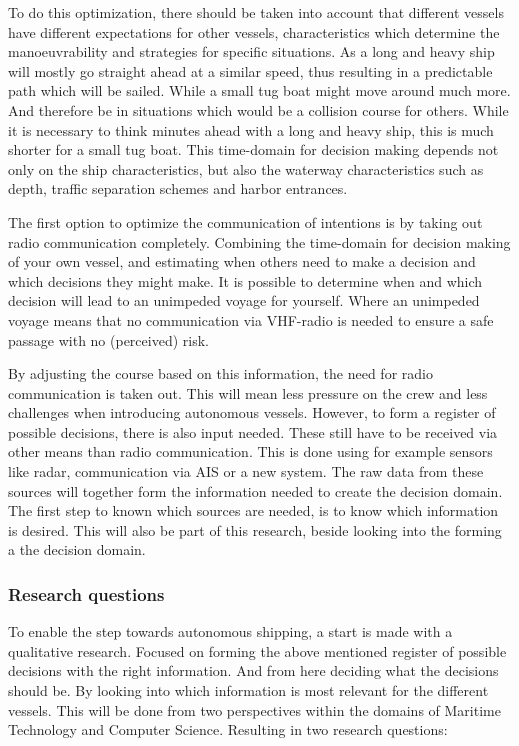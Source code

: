To do this optimization, there should be taken into account that different vessels have different expectations for other vessels, characteristics which determine the manoeuvrability and strategies for specific situations. As a long and heavy ship will mostly go straight ahead at a similar speed, thus resulting in a predictable path which will be sailed. While a small tug boat might move around much more. And therefore be in situations which would be a collision course for others. While it is necessary to think minutes ahead with a long and heavy ship, this is much shorter for a small tug boat. This time-domain for decision making depends not only on the ship characteristics, but also the waterway characteristics such as depth, traffic separation schemes and harbor entrances.

The first option to optimize the communication of intentions is by taking out radio communication completely. Combining the time-domain for decision making of your own vessel, and estimating when others need to make a decision and which decisions they might make. It is possible to determine when and which decision will lead to an unimpeded voyage for yourself. Where an unimpeded voyage means that no communication via VHF-radio is needed to ensure a safe passage with no (perceived) risk.

By adjusting the course based on this information, the need for radio communication is taken out. This will mean less pressure on the crew and less challenges when introducing autonomous vessels.
However, to form a register of possible decisions, there is also input needed. These still have to be received via other means than radio communication. This is done using for example sensors like radar, communication via AIS or a new system. The raw data from these sources will together form the information needed to create the decision domain. The first step to known which sources are needed, is to know which information is desired. This will also be part of this research, beside looking into the forming a the decision domain.

\subsubsection*{Research questions}
To enable the step towards autonomous shipping, a start is made with a qualitative research. Focused on forming the above mentioned register of possible decisions with the right information. And from here deciding what the decisions should be. By looking into which information is most relevant for the different vessels. This will be done from two perspectives within the domains of Maritime Technology and Computer Science. Resulting in two research questions:

